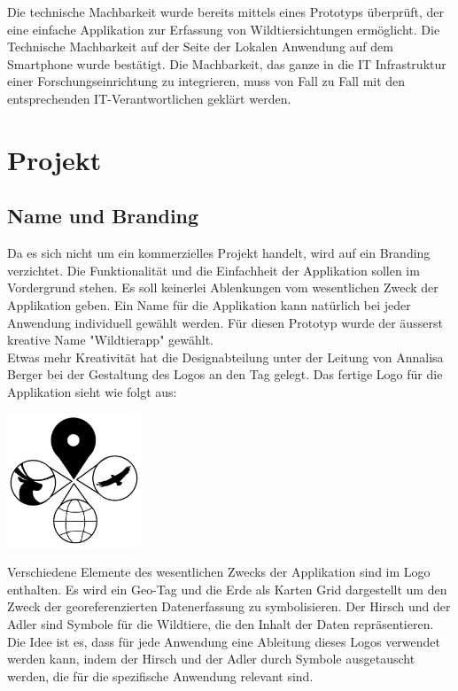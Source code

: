 \documentclass{article}
\begin{document}
Die technische Machbarkeit wurde bereits mittels eines Prototyps überprüft, der eine einfache Applikation
zur Erfassung von Wildtiersichtungen ermöglicht. Die Technische Machbarkeit auf der Seite der
Lokalen Anwendung auf dem Smartphone wurde bestätigt. Die Machbarkeit, das ganze in die IT Infrastruktur
einer Forschungseinrichtung zu integrieren, muss von Fall zu Fall mit den entsprechenden IT-Verantwortlichen
geklärt werden.

\section{Projekt} %

\subsection{Name und Branding} %

Da es sich nicht um ein kommerzielles Projekt handelt, wird auf ein Branding verzichtet. Die Funktionalität
und die Einfachheit der Applikation sollen im Vordergrund stehen. Es soll keinerlei Ablenkungen vom
wesentlichen Zweck der Applikation geben. Ein Name für die Applikation kann natürlich bei jeder Anwendung individuell gewählt werden. 
Für diesen Prototyp wurde der äusserst kreative Name "Wildtierapp" gewählt.\\

Etwas mehr Kreativität hat die Designabteilung unter der Leitung von Annalisa Berger bei der Gestaltung des Logos
an den Tag gelegt. Das fertige Logo für die Applikation sieht wie folgt aus: \\

\begin{center}
  \includegraphics[width=0.3\textwidth]{"logo_app.png"}
\end{center}

Verschiedene Elemente des wesentlichen Zwecks der Applikation sind im Logo enthalten. Es wird ein Geo-Tag und die Erde als Karten Grid dargestellt
um den Zweck der georeferenzierten Datenerfassung zu symbolisieren. Der Hirsch und der Adler sind Symbole für die Wildtiere,
die den Inhalt der Daten repräsentieren. Die Idee ist es, dass für jede Anwendung eine Ableitung
dieses Logos verwendet werden kann, indem der Hirsch und der Adler durch Symbole ausgetauscht werden, die
für die spezifische Anwendung relevant sind.
\end{document}
